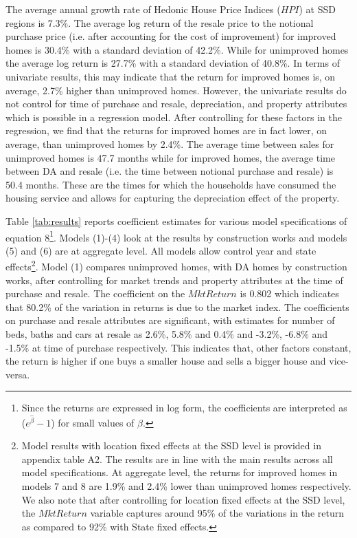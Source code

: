 \documentclass[AEJ,reqno, draftmode]{AEA} %
\begin{document}
The average annual growth rate of Hedonic House Price Indices ($HPI$) at SSD regions is 7.3\%. The average log return of the resale price to the notional purchase price (i.e. after accounting for the cost of improvement) for improved homes is 30.4\% with a standard deviation of 42.2\%. While for unimproved homes the average log return is 27.7\% with a standard deviation of 40.8\%. In terms of univariate results, this may indicate that the return for improved homes is, on average, 2.7\% higher than unimproved homes. However, the univariate results do not control for time of purchase and resale, depreciation, and property attributes which is possible in a regression model. After controlling for these factors in the regression, we find that the returns for improved homes are in fact lower, on average, than unimproved homes by 2.4\%. The average time between sales for unimproved homes is 47.7 months while for improved homes, the average time between DA and resale (i.e. the time between notional purchase and resale) is 50.4 months. These are the times for which the households have consumed the housing service and allows for capturing the depreciation effect of the property.


Table \ref{tab:results} reports coefficient estimates for various model specifications of equation 8\footnote{Since the returns are expressed in log form, the coefficients are interpreted as ($e^{\hat{\beta}}-1$) for small values of $\beta$.}. Models (1)-(4) look at the results by construction works and models (5) and (6) are at aggregate level. All models allow control year and state effects\footnote{Model results with location fixed effects at the SSD level is provided in appendix table A2. The results are in line with the main results across all model specifications. At aggregate level, the returns for improved homes in models 7 and 8 are 1.9\% and 2.4\% lower than unimproved homes respectively. We also note that after controlling for location fixed effects at the SSD level, the $MktReturn$ variable captures around 95\% of the variations in the return as compared to 92\% with State fixed effects.}. Model (1) compares unimproved homes, with DA homes by construction works, after controlling for market trends and property attributes at the time of purchase and resale. The coefficient on the $MktReturn$ is 0.802 which indicates that 80.2\% of the variation in returns is due to the market index. The coefficients on purchase and resale attributes are significant, with estimates for number of beds, baths and cars at resale as 2.6\%, 5.8\% and 0.4\% and -3.2\%, -6.8\% and -1.5\% at time of purchase respectively. This indicates that, other factors constant, the return is higher if one buys a smaller house and sells a bigger house and vice-versa. 
\end{document}
